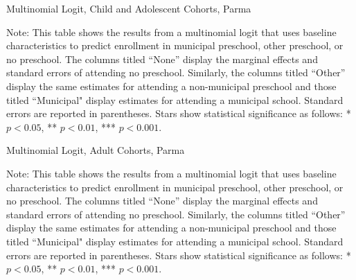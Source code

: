 \begin{table}[H] 
\centering
\caption{Multinomial Logit, Child and Adolescent Cohorts, Parma} \label{mlogit-chi-ado-PR}
\begin{adjustbox}{width=\textwidth}
\begin{threeparttable}

\begin{tablenotes}
\footnotesize\raggedright{Note: This table shows the results from a multinomial logit that uses baseline characteristics to predict enrollment in municipal preschool, other preschool, or no preschool. The columns titled ``None'' display the marginal effects and standard errors of attending no preschool. Similarly, the columns titled ``Other'' display the same estimates for attending a non-municipal preschool and those titled ``Municipal" display estimates for attending a municipal school. Standard errors are reported in parentheses. Stars show statistical significance as follows: * $p < 0.05$, ** $p < 0.01$, *** $p < 0.001$.}
\end{tablenotes}
\end{threeparttable}
\end{adjustbox}
\end{table}

\begin{table}[H] 
\centering
\caption{Multinomial Logit, Adult Cohorts, Parma} \label{mlogit-adult-PR}
\begin{threeparttable}

\begin{tablenotes}
\footnotesize\raggedright{Note: This table shows the results from a multinomial logit that uses baseline characteristics to predict enrollment in municipal preschool, other preschool, or no preschool. The columns titled ``None'' display the marginal effects and standard errors of attending no preschool. Similarly, the columns titled ``Other'' display the same estimates for attending a non-municipal preschool and those titled ``Municipal" display estimates for attending a municipal school. Standard errors are reported in parentheses. Stars show statistical significance as follows: * $p < 0.05$, ** $p < 0.01$, *** $p < 0.001$.}
\end{tablenotes}
\end{threeparttable}
\end{table}

